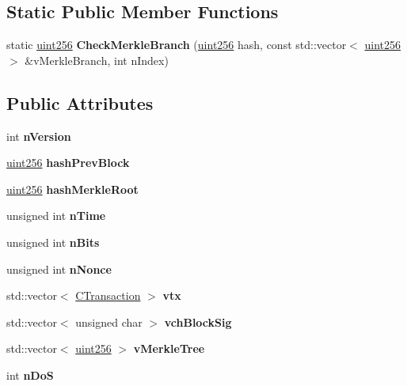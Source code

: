 \subsection*{Static Public Member Functions}
\begin{DoxyCompactItemize}
\item 
\mbox{\label{class_c_block_ab0d596c51fb317e3cb6f444015a652a5}} 
static \mbox{\hyperlink{classuint256}{uint256}} {\bfseries Check\+Merkle\+Branch} (\mbox{\hyperlink{classuint256}{uint256}} hash, const std\+::vector$<$ \mbox{\hyperlink{classuint256}{uint256}} $>$ \&v\+Merkle\+Branch, int n\+Index)
\end{DoxyCompactItemize}
\subsection*{Public Attributes}
\begin{DoxyCompactItemize}
\item 
\mbox{\label{class_c_block_a6f7ce520ce3c63adc6216f9d41d04476}} 
int {\bfseries n\+Version}
\item 
\mbox{\label{class_c_block_ab426862984450319201948c7a856bd09}} 
\mbox{\hyperlink{classuint256}{uint256}} {\bfseries hash\+Prev\+Block}
\item 
\mbox{\label{class_c_block_a42d757b4dd51d517f7877d2a5ece94b4}} 
\mbox{\hyperlink{classuint256}{uint256}} {\bfseries hash\+Merkle\+Root}
\item 
\mbox{\label{class_c_block_af1a91982c7a291952a279ee341ee1713}} 
unsigned int {\bfseries n\+Time}
\item 
\mbox{\label{class_c_block_a4b978e9c3c8d0edd8a32031348b4086f}} 
unsigned int {\bfseries n\+Bits}
\item 
\mbox{\label{class_c_block_afd78e38be105c00158198be96e1b6f5d}} 
unsigned int {\bfseries n\+Nonce}
\item 
\mbox{\label{class_c_block_a9b6508d662722775f3029b980b382b66}} 
std\+::vector$<$ \mbox{\hyperlink{class_c_transaction}{C\+Transaction}} $>$ {\bfseries vtx}
\item 
\mbox{\label{class_c_block_a78f882e24c4416f42039cbc6a67faf6e}} 
std\+::vector$<$ unsigned char $>$ {\bfseries vch\+Block\+Sig}
\item 
\mbox{\label{class_c_block_a019ae6579acd08974653d3f443dd398a}} 
std\+::vector$<$ \mbox{\hyperlink{classuint256}{uint256}} $>$ {\bfseries v\+Merkle\+Tree}
\item 
\mbox{\label{class_c_block_a5964dd84b7e1a9585422bed6ad5541ef}} 
int {\bfseries n\+DoS}
\end{DoxyCompactItemize}
